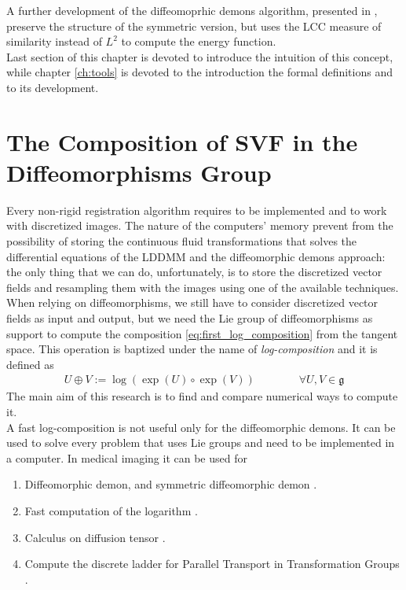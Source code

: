 A further development of the diffeomoprhic demons algorithm, presented in \cite{lorenzi2013lcc}, preserve the structure of the symmetric version, but uses the LCC measure of similarity instead of $L^{2}$ to compute the energy function.\\

Last section of this chapter is devoted to introduce the intuition of this concept, while chapter \ref{ch:tools} is devoted to the introduction the formal definitions and to its development.


\section{The Composition of SVF in the Diffeomorphisms Group}

Every non-rigid registration algorithm requires to be implemented and to work with discretized images.
The nature of the computers' memory prevent from the possibility of storing the continuous fluid transformations that solves the differential equations of the LDDMM and the diffeomorphic demons approach: the only thing that we can do, unfortunately, is to store the discretized vector fields and resampling them with the images using one of the available techniques.\\
When relying on diffeomorphisms, we still have to consider discretized vector fields as input and output, but we need the Lie group of diffeomorphisms as support to compute the composition \ref{eq:first_log_composition} from the tangent space.
This operation is baptized under the name of \emph{log-composition} and it is defined as
\begin{align*}
U \oplus V := \log(\exp(U)\circ\exp( V))
\qquad \qquad
\forall U, V \in \mathfrak{g}
\end{align*}
The main aim of this research is to find and compare numerical ways to compute it. \\

A fast log-composition is not useful only for the diffeomorphic demons. It can be used to solve every problem that uses Lie groups and need to be implemented in a computer. In medical imaging it can be used for
\begin{enumerate}
	\item Diffeomorphic demon, and symmetric diffeomorphic demon \cite{vercauteren2006robust, vercauteren08}.
	\item Fast computation of the logarithm \cite{Bossa:08}.
	\item Calculus on diffusion tensor \cite{Arsigny:MRM:06}. 
	\item Compute the discrete ladder for Parallel Transport in Transformation Groups \cite{Lorenzi:discrete_ladders:14}.
\end{enumerate}	
	
